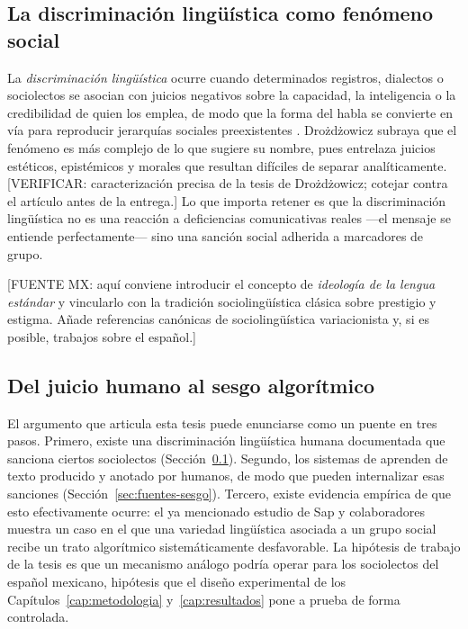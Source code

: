 \subsection{La discriminación lingüística como fenómeno social}
\label{sec:discriminacion-ling}

La \emph{discriminación lingüística} ocurre cuando determinados registros,
dialectos o sociolectos se asocian con juicios negativos sobre la capacidad, la
inteligencia o la credibilidad de quien los emplea, de modo que la forma del
habla se convierte en vía para reproducir jerarquías sociales preexistentes
\cite{Weissler2022}. Drożdżowicz \cite{Drozdzowicz2024} subraya que el fenómeno
es más complejo de lo que sugiere su nombre, pues entrelaza juicios estéticos,
epistémicos y morales que resultan difíciles de separar analíticamente.
[VERIFICAR: caracterización precisa de la tesis de Drożdżowicz; cotejar contra
el artículo antes de la entrega.] Lo que importa retener es que la
discriminación lingüística no es una reacción a deficiencias comunicativas
reales ---el mensaje se entiende perfectamente--- sino una sanción social
adherida a marcadores de grupo.

[FUENTE MX: aquí conviene introducir el concepto de \emph{ideología de la
lengua estándar} y vincularlo con la tradición sociolingüística clásica sobre
prestigio y estigma. Añade referencias canónicas de sociolingüística variacionista
y, si es posible, trabajos sobre el español.]

\subsection{Del juicio humano al sesgo algorítmico}
\label{sec:puente}

El argumento que articula esta tesis puede enunciarse como un puente en tres
pasos. Primero, existe una discriminación lingüística humana documentada que
sanciona ciertos sociolectos (Sección~\ref{sec:discriminacion-ling}). Segundo,
los sistemas de \PLN aprenden de texto producido y anotado por humanos, de modo
que pueden internalizar esas sanciones (Sección~\ref{sec:fuentes-sesgo}).
Tercero, existe evidencia empírica de que esto efectivamente ocurre: el ya
mencionado estudio de Sap y colaboradores \cite{Sap2019Risk} muestra un caso en
el que una variedad lingüística asociada a un grupo social recibe un trato
algorítmico sistemáticamente desfavorable. La hipótesis de trabajo de la tesis
es que un mecanismo análogo podría operar para los sociolectos del español
mexicano, hipótesis que el diseño experimental de los
Capítulos~\ref{cap:metodologia} y~\ref{cap:resultados} pone a prueba de forma
controlada.

